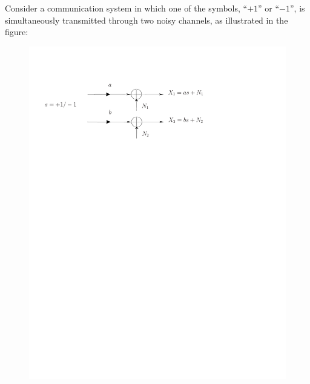 \else

\question Consider a communication system in which one  of the symbols, ``$+1$'' or ``$-1$'', is simultaneously transmitted through two noisy channels, as illustrated in the figure:
\begin{figure}[h]
\begin{center}
\includegraphics[width=12cm, trim=0cm 20.5cm 4cm 2.5cm]{Figuras/canal_gauss}
\end{center}
\end{figure}

